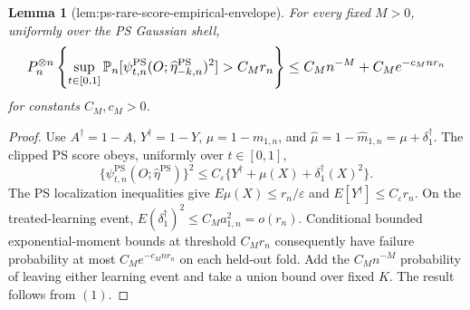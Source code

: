 \documentclass{article}
\newtheorem{lemma}{Lemma}
\begin{document}
\begin{lemma}[lem:ps-rare-score-empirical-envelope]\label{lem:ps-rare-score-empirical-envelope}
For every fixed \(M>0\), uniformly over the PS Gaussian shell,
\[
\makebox[\linewidth][c]{\resizebox{0.98\linewidth}{!}{\par\noindent \makebox[\linewidth][c]{\resizebox{0.98\linewidth}{!}{\(\displaystyle \displaystyle P_n^{\otimes n}\left\{\sup_{t\in[0,1]}\mathbb P_n[\psi_{t,n}^{\mathrm{PS}}(O;\widehat\eta_{-k,n}^{\mathrm{PS}})^2]>C_Mr_n\right\}\le C_Mn^{-M}+C_Me^{-c_Mnr_n}\)}}\par\noindent}}
\]
for constants \(C_M,c_M>0\).
\end{lemma}
\begin{proof}
Use \(A^\dagger=1-A\), \(Y^\dagger=1-Y\), \(\mu=1-m_{1,n}\), and \(\widehat\mu=1-\widehat m_{1,n}=\mu+\delta_1^\dagger\). The clipped PS score obeys, uniformly over \(t\in[0,1]\),
\[\{\psi_{t,n}^{\mathrm{PS}}(O;\widehat\eta^{\mathrm{PS}})\}^2\le C_\varepsilon\{Y^\dagger+\mu(X)+\delta_1^\dagger(X)^2\}.\tag{1}\]
The PS localization inequalities give \(E\mu(X)\le r_n/\varepsilon\) and \(E[Y^\dagger]\le C_\varepsilon r_n\). On the treated-learning event, \(E(\delta_1^\dagger)^2\le C_Ma_{1,n}^2=o(r_n)\). Conditional bounded exponential-moment bounds at threshold \(C_Mr_n\) consequently have failure probability at most \(C_Me^{-c_Mnr_n}\) on each held-out fold. Add the \(C_Mn^{-M}\) probability of leaving either learning event and take a union bound over fixed \(K\). The result follows from \((1)\).
\end{proof}
\end{document}

